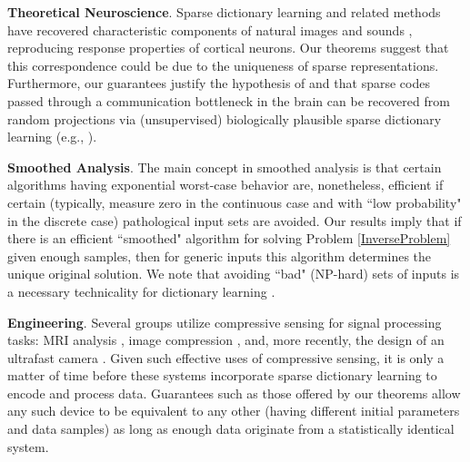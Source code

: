 \documentclass[9pt,twocolumn]{pnas-new}
\begin{document}
\textbf{Theoretical Neuroscience}.
Sparse dictionary learning and related methods have recovered characteristic components of natural images \cite{Olshausen96, hurri1996image, bell1997independent, van1998independent} and sounds \cite{bellsejnowski1996, smithlewicki2006, Carlson12}, reproducing response properties of cortical neurons. Our theorems suggest that this correspondence could be due to the uniqueness of sparse representations. Furthermore, our guarantees justify the hypothesis of \cite{Coulter10} and \cite{Isely10} that sparse codes passed through a communication bottleneck in the brain can be recovered from random projections via (unsupervised) biologically plausible sparse dictionary learning (e.g., \cite{rozell2007neurally, hu2014hebbian}).   

\textbf{Smoothed Analysis}.
The main concept in smoothed analysis \cite{Spielman04} is that certain algorithms having exponential worst-case behavior are, nonetheless, efficient if certain (typically, measure zero in the continuous case and with ``low probability" in the discrete case) pathological input sets are avoided. Our results imply that if there is an efficient ``smoothed" algorithm for solving Problem \ref{InverseProblem} given enough samples, then for generic inputs this algorithm determines the unique original solution. We note that avoiding ``bad" (NP-hard) sets of inputs is a necessary technicality for dictionary learning \cite{Razaviyayn15, Tillmann15}.

\textbf{Engineering}.
Several groups utilize compressive sensing for signal processing tasks: MRI analysis \cite{lustig2008compressed},  image compression \cite{Duarte08}, and, more recently, the design of an ultrafast camera \cite{Gao14}. Given such effective uses of compressive sensing, it is only a matter of time before these systems incorporate sparse dictionary learning to encode and process data. Guarantees such as those offered by our theorems allow any such device to be equivalent to any other (having different initial parameters and data samples) as long as enough data originate from a statistically identical system.



\showacknow %
\end{document}
